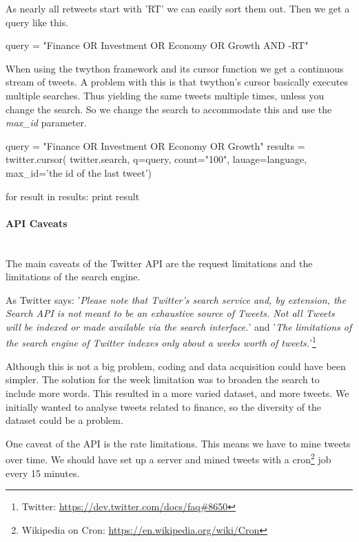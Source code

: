 As nearly all retweets start with 'RT' we can easily sort them out. Then we get
a query like this. 
\begin{python}
query = "Finance OR Investment OR Economy OR Growth AND -RT"
\end{python}

When using the twython framework and its cursor function we get a continuous
stream of tweets. A problem with this is that twython's cursor basically
executes multiple searches. Thus yielding the same tweets multiple times,
unless you change the search. So we change the search to accommodate this and
use the \textit{max\_id} parameter.
\begin{python}
query = "Finance OR Investment OR Economy OR Growth"
results = twitter.cursor(
                twitter.search,
                q=query,
                count="100",
                lauage=language,
                max_id='the id of the last tweet')

for result in results:
    print result
\end{python}
%

\paragraph{API Caveats}
\hspace{0pt}\\
The main caveats of the Twitter API are the request limitations and the
limitations of the search engine. 

As Twitter says: 
'\textit{Please note that Twitter's search service and, by extension, the Search
API is not meant to be an exhaustive source of Tweets. Not all Tweets will be
indexed or made available via the search interface.}' and 
'\textit{The limitations of the search engine of Twitter indexes only about a
weeks worth of tweets.}'\footnote{Twitter:
\url{https://dev.twitter.com/docs/faq#8650}}

Although this is not a big problem, coding and data acquisition could have been
simpler. The solution for the week limitation was to broaden the search to
include more words. This resulted in a more varied dataset, and more
tweets. We initially wanted to analyse tweets related to finance, so the
diversity of the dataset could be a problem. 

One caveat of the API is the rate limitations. This means we have to mine
tweets over time. We should have set up a server and mined
tweets with a cron\footnote{Wikipedia on Cron:
\url{https://en.wikipedia.org/wiki/Cron}} job every 15 minutes.
%

